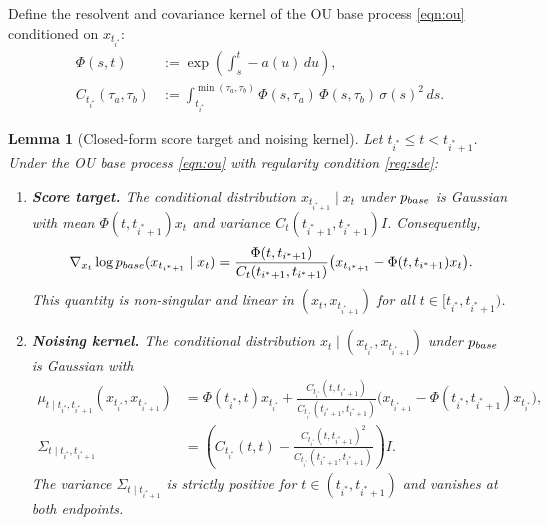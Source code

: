 \documentclass{article}
\newcommand{\pbase}{p_{\normalfont{base}}}
\newtheorem{lemma}{Lemma}
\begin{document}
Define the resolvent and covariance kernel of the OU base process \eqref{eqn:ou}
conditioned on $x_{t_{i^*}}$:
\begin{align}
  \Phi(s,t) &:= \exp\left(\int_s^t -a(u)\,du\right), \label{eqn:phi}\\
  C_{t_{i^*}}(\tau_a,\tau_b)
  &:= \int_{t_{i^*}}^{\min(\tau_a,\tau_b)}
      \Phi(s,\tau_a)\,\Phi(s,\tau_b)\,\sigma(s)^2\,ds. \label{eqn:cov_kernel}
\end{align}

\begin{lemma}[Closed-form score target and noising kernel]\label{lem:gaussian_kernels}
Let $t_{i^*}\leq t < t_{i^*+1}$.  Under the OU base process \eqref{eqn:ou} with
regularity condition \ref{reg:sde}:
\begin{enumerate}[label=(\roman*)]

\item \textbf{Score target.}
  The conditional distribution $x_{t_{i^*+1}}\mid x_t$ under $\pbase$ is
  Gaussian with mean $\Phi(t,t_{i^*+1})x_t$ and variance $C_t(t_{i^*+1},t_{i^*+1})I$.
  Consequently,
  \begin{equation}\label{eqn:score_target}
    \nabla_{x_t}\log\pbase(x_{t_{i^*+1}}\mid x_t)
    = \frac{\Phi(t,t_{i^*+1})}{C_t(t_{i^*+1},t_{i^*+1})}
      \bigl(x_{t_{i^*+1}}-\Phi(t,t_{i^*+1})x_t\bigr).
  \end{equation}
  This quantity is non-singular and linear in $(x_t, x_{t_{i^*+1}})$ for all
  $t\in[t_{i^*},t_{i^*+1})$.

\item \textbf{Noising kernel.}
  The conditional distribution $x_t\mid (x_{t_{i^*}},x_{t_{i^*+1}})$ under
  $\pbase$ is Gaussian with
  \begin{align}
    \mu_{t\mid t_{i^*}, t_{i^*+1}}(x_{t_{i^*}}, x_{t_{i^*+1}})
    &= \Phi(t_{i^*},t)x_{t_{i^*}}
       + \frac{C_{t_{i^*}}(t,t_{i^*+1})}{C_{t_{i^*}}(t_{i^*+1},t_{i^*+1})}
         \bigl(x_{t_{i^*+1}}-\Phi(t_{i^*},t_{i^*+1})x_{t_{i^*}}\bigr),
       \label{eqn:noising_mean}\\
    \Sigma_{t\mid t_{i^*}, t_{i^*+1}}
    &= \left(C_{t_{i^*}}(t,t)
       - \frac{C_{t_{i^*}}(t,t_{i^*+1})^2}{C_{t_{i^*}}(t_{i^*+1},t_{i^*+1})}\right)I.
       \label{eqn:noising_var}
  \end{align}
  The variance $\Sigma_{t\mid t_{i^*+1}}$ is strictly positive for
  $t\in(t_{i^*},t_{i^*+1})$ and vanishes at both endpoints.
\end{enumerate}
\end{lemma}
\end{document}
